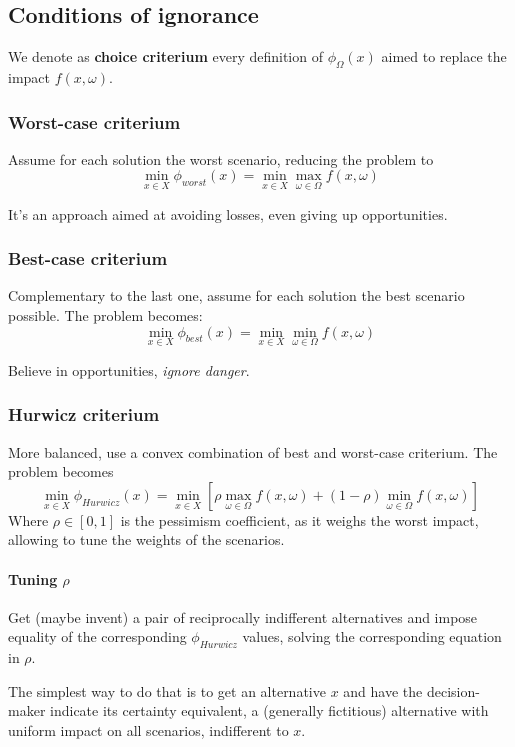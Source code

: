 \subsection{Conditions of ignorance}

We denote as \textbf{choice criterium} every definition of $\phi_\Omega (x)$ aimed to replace the impact $f(x, \omega)$.

\subsubsection{Worst-case criterium}

Assume for each solution the worst scenario, reducing the problem to
$$ \min_{x \in X} \phi_{worst} (x) = \min_{x \in X} \max_{\omega \in \Omega} f(x, \omega) $$

It's an approach aimed at avoiding losses, even giving up opportunities. 

\subsubsection{Best-case criterium}

Complementary to the last one, assume for each solution the best scenario possible. The problem becomes: 
$$ \min_{x \in X} \phi_{best} (x) = \min_{x \in X} \min_{\omega \in \Omega} f(x, \omega) $$

Believe in opportunities, \textit{ignore danger}.

\subsubsection{Hurwicz criterium}

More balanced, use a convex combination of best and worst-case criterium. The problem becomes
$$ \min_{x \in X} \phi_{Hurwicz} (x) = \min_{x \in X} \left[\rho \max_{\omega \in \Omega} f(x, \omega) + (1 - \rho) \min_{\omega \in \Omega} f(x, \omega) \right]$$
Where $\rho \in [0,1]$ is the pessimism coefficient, as it weighs the worst impact, allowing to tune the weights of the scenarios.

\paragraph{Tuning $\rho$} Get (maybe invent) a pair of reciprocally indifferent alternatives and impose equality of the corresponding $\phi_{Hurwicz}$ values, solving the corresponding equation in $\rho$.

The simplest way to do that is to get an alternative $x$ and have the decision-maker indicate its certainty equivalent, a (generally fictitious) alternative with uniform impact on all scenarios, indifferent to $x$.

